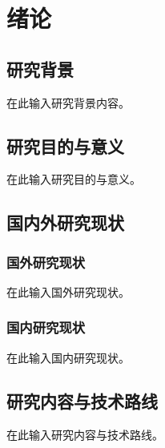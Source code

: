 \chapter{绪论}

\section{研究背景}

在此输入研究背景内容。

\section{研究目的与意义}

在此输入研究目的与意义。

\section{国内外研究现状}

\subsection{国外研究现状}

在此输入国外研究现状。

\subsection{国内研究现状}

在此输入国内研究现状。

\section{研究内容与技术路线}

在此输入研究内容与技术路线。
